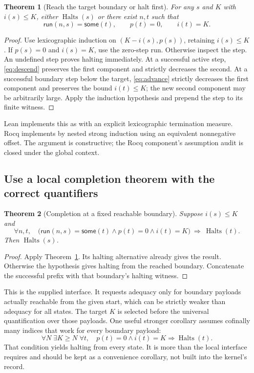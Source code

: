\documentclass[11pt]{article}
\newcommand{\code}[1]{\texttt{\detokenize{#1}}}
\newcommand{\Halts}{\operatorname{Halts}}
\newtheorem{theorem}{Theorem}[section]
\begin{document}
\begin{theorem}[Reach the target boundary or halt first]
\label{thm:seek}
For any $s$ and $K$ with $i(s)\leq K$, either $\Halts(s)$ or there exist $n,t$
such that
\[
 \mathsf{run}(n,s)=\mathsf{some}(t),\qquad p(t)=0,\qquad i(t)=K.
\]
\end{theorem}

\begin{proof}
Use lexicographic induction on $(K-i(s),p(s))$, retaining $i(s)\leq K$.
If $p(s)=0$ and $i(s)=K$, use the zero-step run. Otherwise inspect the step.
An undefined step proves halting immediately. At a successful active step,
\eqref{eq:descend} preserves the first component and strictly decreases the
second. At a successful boundary step below the target,
\eqref{eq:advance} strictly decreases the first component and preserves the
bound $i(t)\leq K$; the new second component may be arbitrarily large.
Apply the induction hypothesis and prepend the step to its finite witness.
\end{proof}

Lean implements this as \code{reach_or_halt} with an explicit lexicographic
termination measure. Rocq implements \code{seek} by nested strong induction
using an equivalent nonnegative offset. The argument is constructive; the
Rocq component's assumption audit is closed under the global context.

\subsection{Use a local completion theorem with the correct quantifiers}

\begin{theorem}[Completion at a fixed reachable boundary]
\label{thm:complete}
Suppose $i(s)\leq K$ and
\[
 \forall n,t,\quad
 \bigl(\mathsf{run}(n,s)=\mathsf{some}(t)\land p(t)=0\land i(t)=K\bigr)
 \ \Longrightarrow\ \Halts(t).
\]
Then $\Halts(s)$.
\end{theorem}

\begin{proof}
Apply Theorem~\ref{thm:seek}. Its halting alternative already gives the result.
Otherwise the hypothesis gives halting from the reached boundary. Concatenate
the successful prefix with that boundary's halting witness.
\end{proof}

This is the supplied \code{complete_at} interface. It requests adequacy only
for boundary payloads actually reachable from the given start, which can be
strictly weaker than adequacy for all states. The target $K$ is selected before
the universal quantification over those payloads. One useful stronger
corollary assumes cofinally many indices that work for every boundary payload:
\[
 \forall N\;\exists K\geq N\;\forall t,\quad
   p(t)=0\land i(t)=K\Longrightarrow\Halts(t).
\]
That condition yields halting from every state. It is more than the local
interface requires and should be kept as a convenience corollary, not built
into the kernel's record.
\end{document}

